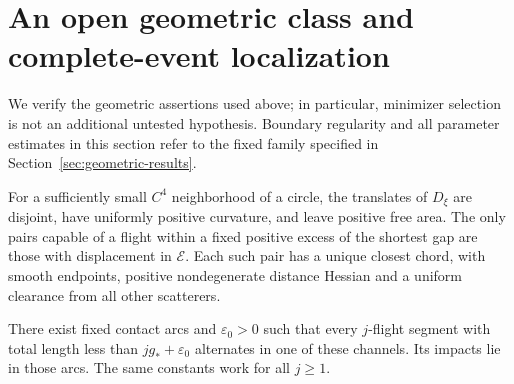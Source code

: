 \section{An open geometric class and complete-event localization}
\label{sec:g-localization}
We verify the geometric assertions used above; in particular, minimizer
selection is not an additional untested hypothesis. Boundary regularity
and all parameter estimates in this section refer to the fixed family
specified in Section~\ref{sec:geometric-results}.

\begin{lemma}\label{lem:g-channels}
For a sufficiently small $C^4$ neighborhood of a circle, the translates
of $D_\xi$ are disjoint, have uniformly positive curvature, and leave
positive free area. The only pairs capable of a flight within a fixed
positive excess of the shortest gap are those with displacement in
$\mathcal E$. Each such pair has a unique closest chord, with smooth
endpoints, positive nondegenerate distance Hessian and a uniform
clearance from all other scatterers.

There exist fixed contact arcs and $\varepsilon_0>0$ such that every
$j$-flight segment with total length less than $jg_*+\varepsilon_0$
alternates in one of these channels. Its impacts lie in those arcs.
The same constants work for all $j\ge1$.
\end{lemma}
